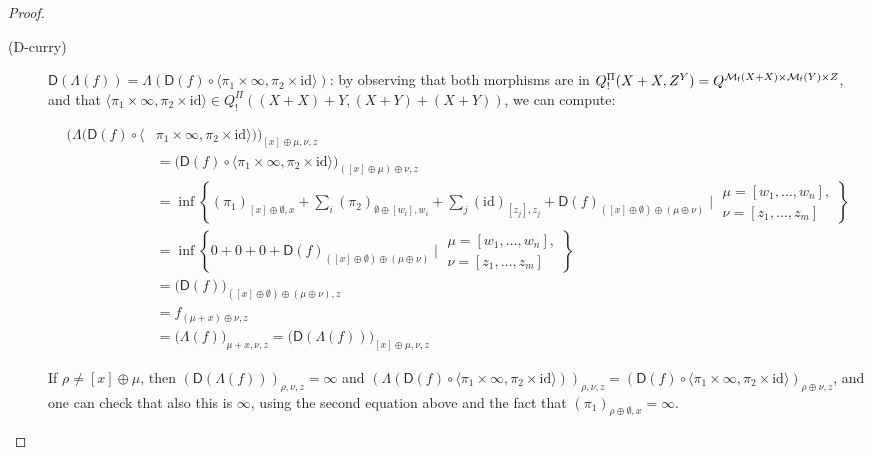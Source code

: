\begin{proof}
\begin{description}
\item[(D-curry)] $\mathsf D(\Lambda(f))=
\Lambda(\mathsf D(f)\circ \langle \pi_{1}\times \infty, \pi_{2}\times \mathrm{id}\rangle)$:
by observing that both morphisms are 
in $Q^{\Pi}_{!}(X+X, Z^{Y})= Q^{\mathcal{M}_{\mathsf f}(X+X)\times \mathcal{M}_{\mathsf f}(Y)\times Z}$, 
and that $ \langle \pi_{1}\times \infty, \pi_{2}\times \mathrm{id}\rangle
\in Q^{\Pi}_{!}( (X+X)+Y  , (X+Y)+(X+Y) )$,
we can compute:

{\small
\begin{align*}
\big(\Lambda(\mathsf D(f)\circ \langle&  \pi_{1}\times \infty, \pi_{2}\times \mathrm{id}\rangle)\big)_{[x]\oplus\mu,\nu,z}\\
&=
\big(\mathsf D(f)\circ \langle \pi_{1}\times \infty, \pi_{2}\times \mathrm{id}\rangle\big)_{([x]\oplus\mu)\oplus\nu, z}\\
&=
\inf\left\{
( \pi_{1})_{[x]\oplus \emptyset,x}+
\sum_{i}(\pi_{2})_{\emptyset\oplus [w_{i}],w_{i}}
+
\sum_{j}(\mathrm{id})_{[z_{j}],z_{j}}
 + \mathsf D(f)_{([x]\oplus \emptyset)\oplus(\mu\oplus \nu)}
\mid
\begin{matrix}
\mu=[w_{1},\dots, w_{n}],\\
\nu=[z_{1},\dots, z_{m}]
\end{matrix}
\right\}\\
&=
\inf\left\{
0+0
+
0 + \mathsf D(f)_{([x]\oplus \emptyset)\oplus(\mu\oplus \nu)}
\mid
\begin{matrix}
\mu=[w_{1},\dots, w_{n}],\\
\nu=[z_{1},\dots, z_{m}]
\end{matrix}
\right\}\\
&=
\big(\mathsf D(f)\big)_{ ([x]\oplus\emptyset)\oplus(\mu\oplus\nu),z}\\
&=
f_{(\mu+x)\oplus\nu, z}\\
& =
\big(\Lambda(f)\big)_{\mu+x,\nu,z}=\big(\mathsf D(\Lambda(f))\big)_{[x]\oplus\mu, \nu,z}
\end{align*}
}

If $\rho\neq [x]\oplus\mu$, then $(\mathsf D(\Lambda(f)))_{\rho,\nu,z}=\infty$ and $
(\Lambda(\mathsf D(f)\circ \langle  \pi_{1}\times \infty, \pi_{2}\times \mathrm{id}\rangle))_{\rho,\nu,z}=
(\mathsf D(f)\circ \langle \pi_{1}\times \infty, \pi_{2}\times \mathrm{id}\rangle)_{\rho\oplus\nu, z}
$, and one can check that also this is $\infty$, using the second equation above and the fact that $(\pi_{1})_{\rho\oplus\emptyset,x}=\infty$.\end{description}


\end{proof}



